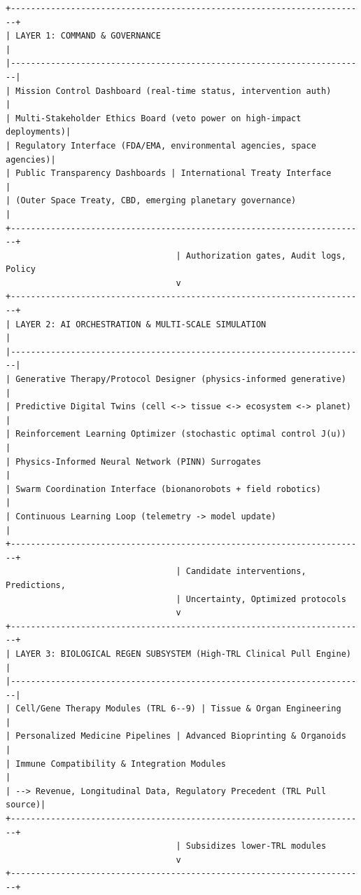\documentclass[11pt,a4paper]{report}
\begin{document}
\begin{lstlisting}[style=asciistyle, caption={URTE High-Level Layered Architecture --- Precise Capability Stack}]
+-----------------------------------------------------------------------+
| LAYER 1: COMMAND & GOVERNANCE                                         |
|-----------------------------------------------------------------------|
| Mission Control Dashboard (real-time status, intervention auth)       |
| Multi-Stakeholder Ethics Board (veto power on high-impact deployments)|
| Regulatory Interface (FDA/EMA, environmental agencies, space agencies)|
| Public Transparency Dashboards | International Treaty Interface       |
| (Outer Space Treaty, CBD, emerging planetary governance)              |
+-----------------------------------------------------------------------+
                                  | Authorization gates, Audit logs, Policy
                                  v
+-----------------------------------------------------------------------+
| LAYER 2: AI ORCHESTRATION & MULTI-SCALE SIMULATION                    |
|-----------------------------------------------------------------------|
| Generative Therapy/Protocol Designer (physics-informed generative)    |
| Predictive Digital Twins (cell <-> tissue <-> ecosystem <-> planet)   |
| Reinforcement Learning Optimizer (stochastic optimal control J(u))    |
| Physics-Informed Neural Network (PINN) Surrogates                     |
| Swarm Coordination Interface (bionanorobots + field robotics)         |
| Continuous Learning Loop (telemetry -> model update)                  |
+-----------------------------------------------------------------------+
                                  | Candidate interventions, Predictions,
                                  | Uncertainty, Optimized protocols
                                  v
+-----------------------------------------------------------------------+
| LAYER 3: BIOLOGICAL REGEN SUBSYSTEM (High-TRL Clinical Pull Engine)   |
|-----------------------------------------------------------------------|
| Cell/Gene Therapy Modules (TRL 6--9) | Tissue & Organ Engineering     |
| Personalized Medicine Pipelines | Advanced Bioprinting & Organoids    |
| Immune Compatibility & Integration Modules                            |
| --> Revenue, Longitudinal Data, Regulatory Precedent (TRL Pull source)|
+-----------------------------------------------------------------------+
                                  | Subsidizes lower-TRL modules
                                  v
+-----------------------------------------------------------------------+

\end{lstlisting}
\end{document}
